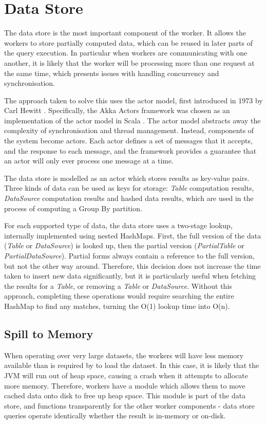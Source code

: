\section{Data Store}
The data store is the most important component of the worker. It allows the workers to store partially computed data, which can be reused in later parts of the query execution. In particular when workers are communicating with one another, it is likely that the worker will be processing more than one request at the same time, which presents issues with handling concurrency and synchronisation.

The approach taken to solve this uses the actor model, first introduced in 1973 by Carl Hewitt \cite{hewitt1973session}. Specifically, the Akka Actors framework was chosen as an implementation of the actor model in Scala \cite{akkaactors}. The actor model abstracts away the complexity of synchronisation and thread management. Instead, components of the system become actors. Each actor defines a set of messages that it accepts, and the response to each message, and the framework provides a guarantee that an actor will only ever process one message at a time.

The data store is modelled as an actor which stores results as key-value pairs. Three kinds of data can be used as keys for storage: \textit{Table} computation results, \textit{DataSource} computation results and hashed data results, which are used in the process of computing a Group By partition. 

For each supported type of data, the data store uses a two-stage lookup, internally implemented using nested HashMaps. First, the full version of the data (\textit{Table} or \textit{DataSource}) is looked up, then the partial version (\textit{PartialTable} or \textit{PartialDataSource}). Partial forms always contain a reference to the full version, but not the other way around. Therefore, this decision does not increase the time taken to insert new data significantly, but it is particularly useful when fetching the results for a \textit{Table}, or removing a \textit{Table} or \textit{DataSource}. Without this approach, completing these operations would require searching the entire HashMap to find any matches, turning the O(1) lookup time into O(n).

\subsection{Spill to Memory}
When operating over very large datasets, the workers will have less memory available than is required by to load the dataset. In this case, it is likely that the JVM will run out of heap space, causing a crash when it attempts to allocate more memory. Therefore, workers have a module which allows them to move cached data onto disk to free up heap space. This module is part of the data store, and functions transparently for the other worker components - data store queries operate identically whether the result is in-memory or on-disk.

